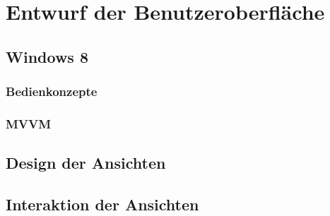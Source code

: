 \chapter{Entwurf der Benutzeroberfläche}\label{chapter_4}
\section{Windows 8}
\subsection{Bedienkonzepte}
\subsection{MVVM}


\section{Design der Ansichten}

\section{Interaktion der Ansichten}